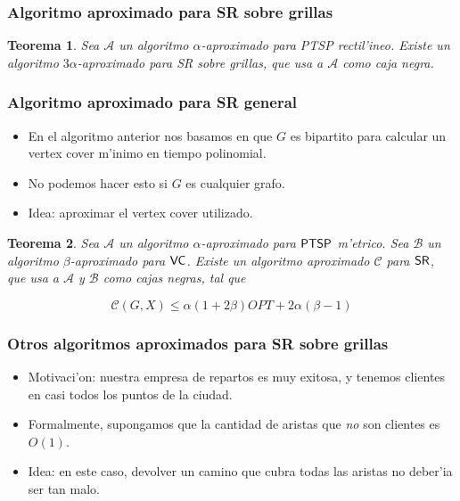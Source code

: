 \documentclass{beamer}
\newcommand{\probl}[1]{\textnormal{\textsf{#1}}}
\newtheorem*{thm}{Teorema}
\begin{document}
\begin{frame}
\frametitle{Algoritmo aproximado para \probl{SR} sobre grillas}

\begin{thm}
Sea $\mathcal{A}$ un algoritmo $\alpha$-aproximado para \probl{PTSP} rectil'ineo. Existe un algoritmo $3\alpha$-aproximado para \probl{SR} sobre grillas, que usa a $\mathcal{A}$ como caja negra.
\end{thm}

\vspace{3mm}

\begin{figure}
	\begin{center}
		
	\end{center}	
\end{figure}

\end{frame}

\begin{frame}
\frametitle{Algoritmo aproximado para \probl{SR} general}

\pause

\begin{itemize}
	\item En el algoritmo anterior nos basamos en que $G$ es bipartito para calcular un vertex cover m'inimo en tiempo polinomial.
	\pause
	\item No podemos hacer esto si $G$ es cualquier grafo.
	\pause
	\item Idea: aproximar el vertex cover utilizado.
\end{itemize}

\pause

\begin{thm}
Sea $\mathcal{A}$ un algoritmo $\alpha$-aproximado para $\probl{PTSP}$ m'etrico. Sea $\mathcal{B}$ un algoritmo $\beta$-aproximado para $\probl{VC}$. Existe un algoritmo aproximado $\mathcal{C}$ para $\probl{SR}$, que usa a $\mathcal{A}$ y $\mathcal{B}$ como cajas negras, tal que

\[\mathcal{C}(G, X) \leq \alpha(1 + 2\beta)OPT + 2\alpha(\beta - 1)\]
\end{thm}

\end{frame}

\begin{frame}
\frametitle{Otros algoritmos aproximados para \probl{SR} sobre grillas}

\pause

\begin{itemize}
	\item Motivaci'on: nuestra empresa de repartos es muy exitosa, y tenemos clientes en casi todos los puntos de la ciudad.
	\pause
	\item Formalmente, supongamos que la cantidad de aristas que \emph{no} son clientes es $O(1)$.
	\pause
	\item Idea: en este caso, devolver un camino que cubra todas las aristas no deber'ia ser tan malo.
\end{itemize}

\end{frame}
\end{document}
